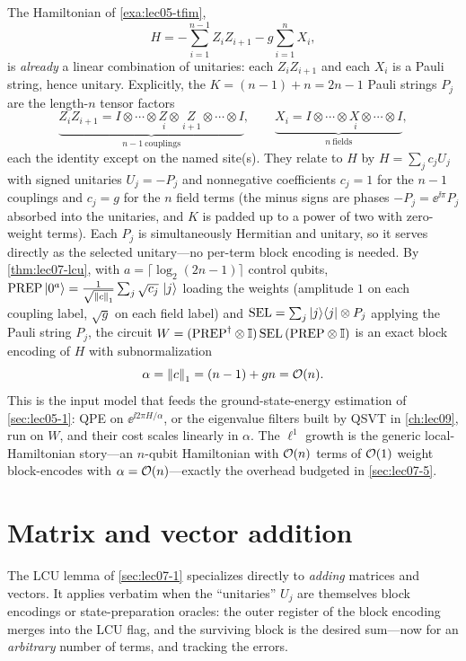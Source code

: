 \begin{example}
\label{exa:lec07-tfim}
The Hamiltonian of \cref{exa:lec05-tfim},
\[
  H=-\sum_{i=1}^{n-1}Z_iZ_{i+1}-g\sum_{i=1}^{n}X_i,
\]
is \emph{already} a linear combination of unitaries: each $Z_iZ_{i+1}$ and each
$X_i$ is a Pauli string, hence unitary. Explicitly, the $K=(n-1)+n=2n-1$ Pauli strings
$P_j$ are the length-$n$ tensor factors
\[
  \underbrace{Z_iZ_{i+1}=I\otimes\cdots\otimes\!\!\underset{\;i}{Z}\otimes\underset{\,i+1}{Z}\!\!\otimes\cdots\otimes I}_{n-1\ \text{couplings}},
  \qquad
  \underbrace{X_i=I\otimes\cdots\otimes\!\!\underset{\;i}{X}\!\!\otimes\cdots\otimes I}_{n\ \text{fields}},
\]
each the identity except on the named site(s). They relate to $H$ by $H=\sum_j c_j U_j$
with signed unitaries $U_j=-P_j$ and nonnegative coefficients
$c_j=1$ for the $n-1$ couplings and $c_j=g$ for the $n$ field terms
(the minus signs are phases $-P_j=\ee^{\ii\pi}P_j$ absorbed into the unitaries, and $K$
is padded up to a power of two with zero-weight terms). Each $P_j$ is simultaneously
Hermitian and unitary, so it serves directly as the selected unitary---no per-term block
encoding is needed. By \cref{thm:lec07-lcu},
with $a=\lceil\log_2(2n-1)\rceil$ control qubits,
$\mathrm{PREP}\ket{0^a}=\tfrac{1}{\sqrt{\left\lVert c \right\rVert_1}}\sum_j\sqrt{c_j}\,\ket{j}$
loading the weights (amplitude $1$ on each coupling label, $\sqrt g$ on each field
label) and $\mathrm{SEL}=\sum_j\ket{j}\!\bra{j}\otimes P_j$ applying the Pauli string $P_j$,
the circuit $W=(\mathrm{PREP}^{\dagger}\otimes\mathbb{I})\,\mathrm{SEL}\,(\mathrm{PREP}\otimes\mathbb{I})$
is an exact block encoding of $H$ with subnormalization
\[
  \alpha=\left\lVert c \right\rVert_1=(n-1)+gn=\mathcal{O}(n).
\]
This is the input model that feeds the ground-state-energy estimation of
\cref{sec:lec05-1}: QPE on $\ee^{\ii 2\pi H/\alpha}$, or the eigenvalue filters built
by QSVT in \cref{ch:lec09}, run on $W$, and their cost scales linearly in
$\alpha$. The $\ell^1$ growth is the generic local-Hamiltonian story---an $n$-qubit
Hamiltonian with $\mathcal{O}(n)$ terms of $\mathcal{O}(1)$ weight block-encodes with
$\alpha=\mathcal{O}(n)$---exactly the overhead budgeted in \cref{sec:lec07-5}.
\end{example}

\section{Matrix and vector addition}
\label{sec:lec07-2}

The LCU lemma of \cref{sec:lec07-1} specializes directly to \emph{adding} matrices and
vectors. It applies verbatim
when the ``unitaries'' $U_j$ are themselves block encodings or state-preparation
oracles: the outer register of the block encoding merges into the LCU flag, and the
surviving block is the desired sum---now for an \emph{arbitrary} number of terms, and
tracking the errors.

